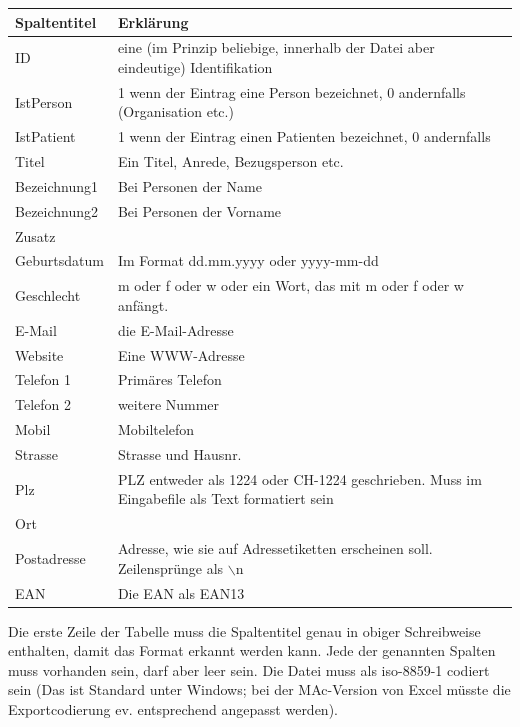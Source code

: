 \begin{tabular}[h]{|l|l|}
\hline Spaltentitel & Erklärung\\
\hline
\hline  ID & eine (im Prinzip beliebige, innerhalb der Datei aber eindeutige) Identifikation\\
\hline IstPerson & 1 wenn der Eintrag eine Person bezeichnet, 0 andernfalls (Organisation etc.)\\
\hline IstPatient & 1 wenn der Eintrag einen Patienten bezeichnet, 0 andernfalls\\
\hline Titel & Ein Titel, Anrede, Bezugsperson etc.\\
\hline Bezeichnung1 & Bei Personen der Name\\
\hline Bezeichnung2 & Bei Personen der Vorname\\
\hline Zusatz & \\
\hline Geburtsdatum & Im Format dd.mm.yyyy oder yyyy-mm-dd\\
\hline Geschlecht & m oder f oder w oder ein Wort, das mit m oder f oder w anfängt.\\
\hline E-Mail & die E-Mail-Adresse\\
\hline Website & Eine WWW-Adresse\\
\hline Telefon 1 & Primäres Telefon\\
\hline Telefon 2 & weitere Nummer\\
\hline Mobil & Mobiltelefon\\
\hline Strasse & Strasse und Hausnr.\\
\hline Plz & PLZ entweder als 1224 oder CH-1224 geschrieben. Muss im Eingabefile als Text formatiert sein\\
\hline Ort & \\
\hline Postadresse & Adresse, wie sie auf Adressetiketten erscheinen soll. Zeilensprünge als $\backslash$n\\
\hline EAN & Die EAN als EAN13\\
\hline
\end{tabular}

\medskip

Die erste Zeile der Tabelle muss die Spaltentitel genau in obiger Schreibweise enthalten, damit das Format erkannt werden kann.
Jede der genannten Spalten muss vorhanden sein, darf aber leer sein. Die Datei muss als iso-8859-1 codiert sein (Das ist Standard unter Windows; bei der MAc-Version von Excel müsste die Exportcodierung ev. entsprechend angepasst werden).

\medskip

